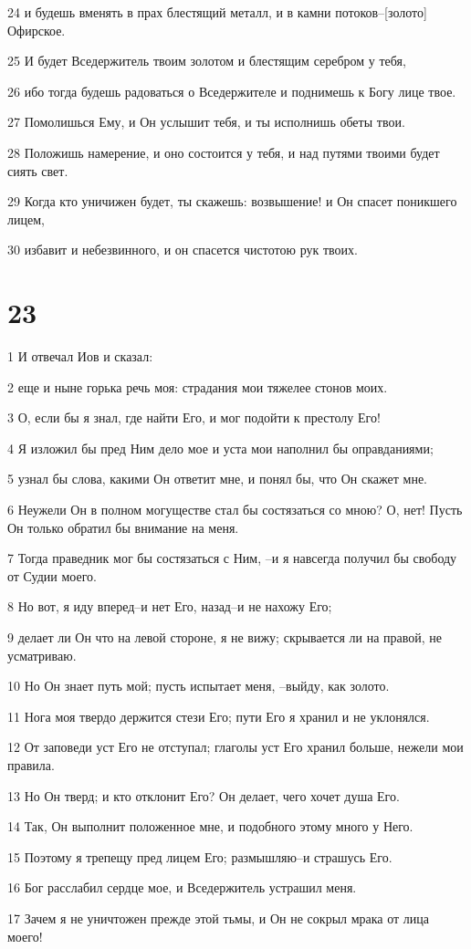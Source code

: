 \par 24 и будешь вменять в прах блестящий металл, и в камни потоков--[золото] Офирское.
\par 25 И будет Вседержитель твоим золотом и блестящим серебром у тебя,
\par 26 ибо тогда будешь радоваться о Вседержителе и поднимешь к Богу лице твое.
\par 27 Помолишься Ему, и Он услышит тебя, и ты исполнишь обеты твои.
\par 28 Положишь намерение, и оно состоится у тебя, и над путями твоими будет сиять свет.
\par 29 Когда кто уничижен будет, ты скажешь: возвышение! и Он спасет поникшего лицем,
\par 30 избавит и небезвинного, и он спасется чистотою рук твоих.

\chapter{23}

\par 1 И отвечал Иов и сказал:
\par 2 еще и ныне горька речь моя: страдания мои тяжелее стонов моих.
\par 3 О, если бы я знал, где найти Его, и мог подойти к престолу Его!
\par 4 Я изложил бы пред Ним дело мое и уста мои наполнил бы оправданиями;
\par 5 узнал бы слова, какими Он ответит мне, и понял бы, что Он скажет мне.
\par 6 Неужели Он в полном могуществе стал бы состязаться со мною? О, нет! Пусть Он только обратил бы внимание на меня.
\par 7 Тогда праведник мог бы состязаться с Ним, --и я навсегда получил бы свободу от Судии моего.
\par 8 Но вот, я иду вперед--и нет Его, назад--и не нахожу Его;
\par 9 делает ли Он что на левой стороне, я не вижу; скрывается ли на правой, не усматриваю.
\par 10 Но Он знает путь мой; пусть испытает меня, --выйду, как золото.
\par 11 Нога моя твердо держится стези Его; пути Его я хранил и не уклонялся.
\par 12 От заповеди уст Его не отступал; глаголы уст Его хранил больше, нежели мои правила.
\par 13 Но Он тверд; и кто отклонит Его? Он делает, чего хочет душа Его.
\par 14 Так, Он выполнит положенное мне, и подобного этому много у Него.
\par 15 Поэтому я трепещу пред лицем Его; размышляю--и страшусь Его.
\par 16 Бог расслабил сердце мое, и Вседержитель устрашил меня.
\par 17 Зачем я не уничтожен прежде этой тьмы, и Он не сокрыл мрака от лица моего!

